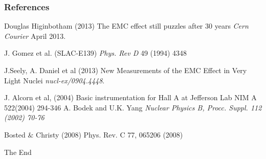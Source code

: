 \documentclass{beamer}
\begin{document}
\begin{frame}
\frametitle{References}
\footnotesize{
\begin{thebibliography}{99} %
 Douglas Higinbotham (2013) 
\newblock The EMC effect still puzzles after 30 years
\newblock \emph{Cern Courier} April 2013.

 J. Gomez et al. (SLAC-E139)  
\newblock \emph{Phys. Rev D}  49 (1994) 4348 

 J.Seely, A. Daniel et al (2013) 
\newblock New Measurements of the EMC Effect in Very Light Nuclei
\newblock \emph{nucl-ex/0904.4448}.

 J. Alcorn et al, (2004)
\newblock Basic instrumentation for Hall A at Jefferson Lab
\newblock NIM A 522(2004) 294-346
 A. Bodek and U.K. Yang
\newblock \emph{Nuclear Physics B, Procc. Suppl. 112 (2002) 70-76 }

 Bosted $\&$ Christy (2008)
\newblock Phys. Rev. C 77, 065206 (2008)

\end{thebibliography}
}
\end{frame}

\begin{frame}
\Huge{\centerline{The End}}
\end{frame}

\end{document}
